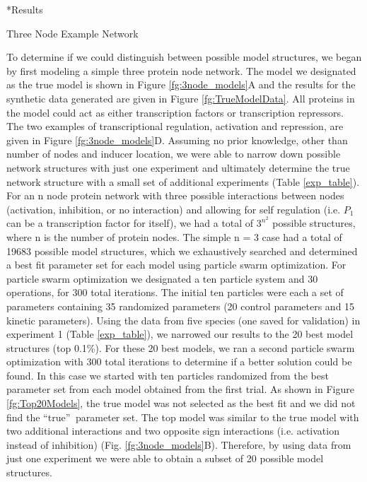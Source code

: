 \documentclass[12pt]{article}
\makeatletter
\renewcommand\subsection{\@startsection
	{subsection}{2}{0mm}
	{-0.05in}
	{-0.5\baselineskip}
	{\normalfont\normalsize\bfseries}}
\renewcommand\section{\@startsection
	{subsection}{2}{0mm}
	{-0.2in}
	{0.05\baselineskip}
	{\normalfont\large\bfseries}}
\makeatother
\begin{document}
\section*{Results}

\subsection{Three Node Example Network}

To determine if we could distinguish between possible model structures, we began by first modeling a simple three protein node network. The model we designated as the true model is shown in Figure \ref{fg:3node_models}A and the results for the synthetic data generated are given in Figure \ref{fg:TrueModelData}. 
All proteins in the model could act as either transcription factors or transcription repressors. 
The two examples of transcriptional regulation, activation and repression, are given in Figure \ref{fg:3node_models}D. 
Assuming no prior knowledge, other than number of nodes and inducer location, we were able to narrow down possible network structures with just one experiment and ultimately determine the true network structure with a small set of additional experiments (Table \ref{exp_table}). 
For an n node protein network with three possible interactions between nodes (activation, inhibition, or no interaction) and allowing for self regulation (i.e. $P_{1}$ can be a transcription factor for itself), we had a total of $3^{n^{2}}$ possible structures, where n is the number of protein nodes. 
The simple n = 3 case had a total of 19683 possible model structures, which we exhaustively searched and determined a best fit parameter set for each model using particle swarm optimization. 
For particle swarm optimization we designated a ten particle system and 30 operations, for 300 total iterations. 
The initial ten particles were each a set of parameters containing 35 randomized parameters (20 control parameters and 15 kinetic parameters). 
Using the data from five species (one saved for validation) in experiment 1 (Table \ref{exp_table}), we narrowed our results to the 20 best model structures (top 0.1\%).   
For these 20 best models, we ran a second particle swarm optimization with 300 total iterations to determine if a better solution could be found.
In this case we started with ten particles randomized from the best parameter set from each model obtained from the first trial.  
As shown in Figure \ref{fg:Top20Models}, the true model was not selected as the best fit and we did not find the  \textquotedblleft true\textquotedblright $\:$ parameter set. 
The top model was similar to the true model with two additional interactions and two opposite sign interactions (i.e. activation instead of inhibition) (Fig. \ref{fg:3node_models}B).
Therefore, by using data from just one experiment we were able to obtain a subset of 20 possible model structures. 
\end{document}
